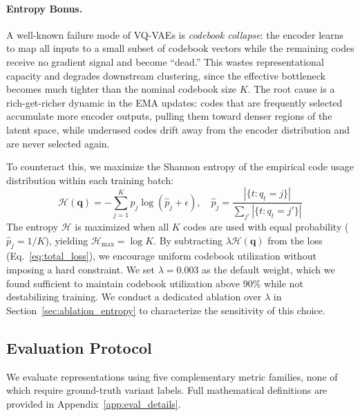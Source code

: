 \documentclass[pmlr]{jmlr}%
\begin{document}
\paragraph{Entropy Bonus.}
A well-known failure mode of VQ-VAEs is \emph{codebook collapse}: the encoder learns to map all inputs to a small subset of codebook vectors while the remaining codes receive no gradient signal and become ``dead.'' This wastes representational capacity and degrades downstream clustering, since the effective bottleneck becomes much tighter than the nominal codebook size $K$. The root cause is a rich-get-richer dynamic in the EMA updates: codes that are frequently selected accumulate more encoder outputs, pulling them toward denser regions of the latent space, while underused codes drift away from the encoder distribution and are never selected again.

To counteract this, we maximize the Shannon entropy of the empirical code usage distribution within each training batch:
\begin{equation}
    \mathcal{H}(\mathbf{q}) = -\sum_{j=1}^{K} \hat{p}_j \log(\hat{p}_j + \epsilon), \quad \hat{p}_j = \frac{|\{t : q_t = j\}|}{\sum_{j'} |\{t : q_t = j'\}|}
\end{equation}
The entropy $\mathcal{H}$ is maximized when all $K$ codes are used with equal probability ($\hat{p}_j = 1/K$), yielding $\mathcal{H}_{\max} = \log K$. By subtracting $\lambda \mathcal{H}(\mathbf{q})$ from the loss (Eq.~\ref{eq:total_loss}), we encourage uniform codebook utilization without imposing a hard constraint. We set $\lambda = 0.003$ as the default weight, which we found sufficient to maintain codebook utilization above 90\% while not destabilizing training. We conduct a dedicated ablation over $\lambda$ in Section~\ref{sec:ablation_entropy} to characterize the sensitivity of this choice.

\subsection{Evaluation Protocol}
\label{sec:eval_protocol}

We evaluate representations using five complementary metric families, none of which require ground-truth variant labels. Full mathematical definitions are provided in Appendix~\ref{app:eval_details}.
\end{document}
